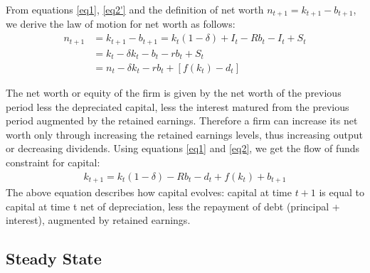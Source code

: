 \documentclass[12pt]{report}
\begin{document}
From equations \ref{eq1}, \ref{eq2'} and the definition of net worth \(n_{t+1}=k_{t+1}-b_{t+1}\), we derive the law of motion for net worth as follows:
\begin{align*}
    n_{t+1}&=k_{t+1}-b_{t+1} = k_{t}(1-\delta) + I_t - R b_{t} - I_t + S_{t} \\
    &= k_{t} - \delta k_{t} - b_{t} - r b_{t}+ S_t \\
    &= n_{t} - \delta k_{t} - r b_{t} + \left[f\left({k_t}\right) - d_t \right]
\end{align*}

The net worth or equity of the firm is given by the net worth of the previous period less the depreciated capital, less
the interest matured from the previous period augmented by the retained earnings. Therefore a firm can increase its
net worth only through increasing the retained earnings levels, thus increasing output or decreasing dividends.
Using equations \ref{eq1} and \ref{eq2}, we get the flow of funds constraint for capital:
\begin{align}
    k_{t+1}=k_{t}(1-\delta)- R b_{t} - d_t + f(k_{t})+b_{t+1} \label{eq3}
\end{align}
The above equation describes how capital evolves: capital at time \(t+1\) is equal to capital at time t
net of depreciation, less the repayment of debt (principal + interest), augmented by retained earnings. 

\subsection{Steady State}
\end{document}

